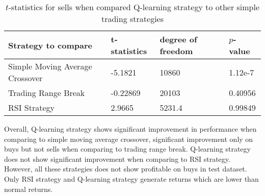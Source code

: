 \documentclass[11pt,a4paper]{article}
\numberwithin{equation}{section}
\begin{document}
\begin{enumerate}
\begin{table}[]
          \centering
          \begin{tabular}{@{}llll@{}}
            \toprule
            Strategy to compare             & t-statistics & degree of freedom & $p$-value \\ \midrule
            Simple Moving Average Crossover & -5.1821      & 10860             & 1.12e-7   \\
            Trading Range Break             & -0.22869     & 20103             & 0.40956   \\
            RSI Strategy                    & 2.9665       & 5231.4            & 0.99849   \\ \bottomrule
          \end{tabular}
          \label{table: t-statistics for sells among different strategies}
          \caption{$t$-statistics for sells when compared Q-learning strategy to other simple trading strategies}
        \end{table}
\end{enumerate}

Overall, Q-learning strategy shows significant improvement in performance when comparing to simple moving average crossover, significant improvement only on buys but not sells when comparing to trading range break. Q-learning strategy does not show significant improvement when comparing to RSI strategy. However, all these strategies does not show profitable on buys in test dataset. Only RSI strategy and Q-learning strategy generate returns which are lower than normal returns.

% 
\end{document}
